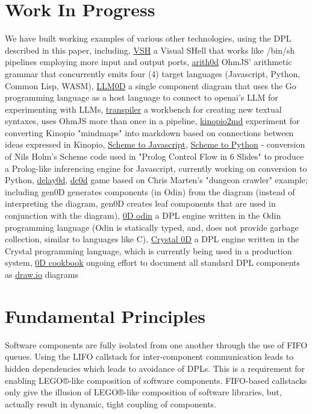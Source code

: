 \documentclass[10pt,anonymous,review]{acmart}
\begin{document}
\section{Work In Progress}
We have built working examples of various other technologies, using the
DPL described in this paper, including,
\underline{VSH}\cite{vsh} a Visual SHell that works like /bin/sh pipelines employing more input and output ports,
\underline{arith0d}\cite{arith0d} OhmJS' arithmetic grammar that concurrently emits four (4) target languages (Javascript, Python, Common Lisp, WASM),
\underline{LLM0D}\cite{llm0d} a single component diagram that uses the Go programming language as a host language to connect to openai's LLM for experimenting with LLMs,
\underline{transpiler}\cite{transpiler} a workbench for creating new textual syntaxes, uses OhmJS more than once in a pipeline,
\underline{kinopio2md}\cite{k2m} experiment for converting Kinopio "mindmaps" into markdown based on connections between ideas expressed in Kinopio,
\underline{Scheme to Javascript}\cite{scm2js}, \underline{Scheme to Python}\cite{scm2py} - conversion of Nils Holm's Scheme code used in "Prolog Control Flow in 6 Slides" to produce a Prolog-like inferencing engine for Javascript, currently working on conversion to Python,
\underline{delay0d}\cite{delay0d},
\underline{dc0d}\cite{dc0d} game based on Chris Marten's "dungeon crawler" example\cite{ceptre_paper}; including gen0D generates components (in Odin) from the diagram (instead of interpreting the diagram, gen0D creates leaf components that are used in conjunction with the diagram),
\underline{0D odin}\cite{odin0d} a DPL engine written in the Odin programming language (Odin is statically typed, and, does not provide garbage collection, similar to languages like C),
\underline{Crystal 0D}\cite{crystal0d} a DPL engine written in the Crystal programming language, which is currently being used in a production system,
\underline{0D cookbook}\cite{0dcookbook} ongoing effort to document all standard DPL components as \href{http://draw.io}{draw.io} diagrams

\section{Fundamental Principles}
Software components are fully isolated from one another through the use
of FIFO queues. Using the LIFO callstack for inter-component
communication leads to hidden dependencies which leads to avoidance of
DPLs. This is a requirement for enabling LEGO®-like composition of software components.
FIFO-based callstacks only give the illusion of LEGO®-like composition of software libraries,
but, actually result in dynamic, tight coupling of components.
\end{document}
